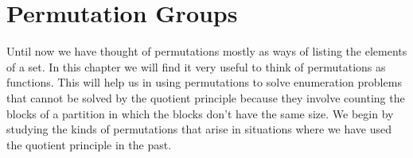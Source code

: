 \documentclass[10pt,]{book}
\theoremstyle{plain}
\theoremstyle{definition}
\numberwithin{equation}{chapter}
\begin{document}
\section[{Permutation Groups}]{Permutation Groups}\label{sec_groups-permgroups}
\typeout{************************************************}
\typeout{************************************************}
Until now we have thought of permutations mostly as ways of listing the elements of a set. In this chapter we will find it very useful to think of permutations as functions. This will help us in using permutations to solve enumeration problems that cannot be solved by the quotient principle because they involve counting the blocks of a partition in which the blocks don't have the same size. We begin by studying the kinds of permutations that arise in situations where we have used the quotient principle in the past.%
\typeout{************************************************}
\typeout{************************************************}
\end{document}
